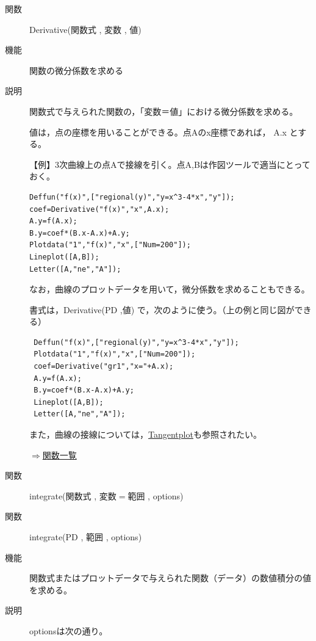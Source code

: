 \documentclass[papersize,a4paper,12pt,uplatex]{jsarticle}
\begin{document}
\begin{description}

\hypertarget{derivative}{}
\item[関数]Derivative(関数式 , 変数 , 値)
\item[機能]関数の微分係数を求める
\item[説明]関数式で与えられた関数の，「変数＝値」における微分係数を求める。

値は，点の座標を用いることができる。点Aのx座標であれば， A.x とする。

\vspace{\baselineskip}
【例】3次曲線上の点Aで接線を引く。点A,Bは作図ツールで適当にとっておく。
\begin{verbatim}
Deffun("f(x)",["regional(y)","y=x^3-4*x","y"]);
coef=Derivative("f(x)","x",A.x);
A.y=f(A.x);
B.y=coef*(B.x-A.x)+A.y;
Plotdata("1","f(x)","x",["Num=200"]);
Lineplot([A,B]);
Letter([A,"ne","A"]);
\end{verbatim}
\begin{center}  \end{center}


なお，曲線のプロットデータを用いて，微分係数を求めることもできる。

書式は，Derivative(PD ,値) で，次のように使う。（上の例と同じ図ができる）

\begin{verbatim}
 Deffun("f(x)",["regional(y)","y=x^3-4*x","y"]);
 Plotdata("1","f(x)","x",["Num=200"]);
 coef=Derivative("gr1","x="+A.x);
 A.y=f(A.x);
 B.y=coef*(B.x-A.x)+A.y;
 Lineplot([A,B]);
 Letter([A,"ne","A"]);
\end{verbatim}

また，曲線の接線については，\hyperlink{tangentplot}{Tangentplot}も参照されたい。

\begin{flushright}\hyperlink{functionlist}{$\Rightarrow$関数一覧}\end{flushright}

\vspace{\baselineskip}
\hypertarget{integrate}{}
\item[関数]integrate(関数式 , 変数$=$範囲 , options)
\item[関数]integrate(PD , 範囲 , options)
\item[機能]関数式またはプロットデータで与えられた関数（データ）の数値積分の値を求める。
\item[説明]optionsは次の通り。


\end{description}
\end{document}
